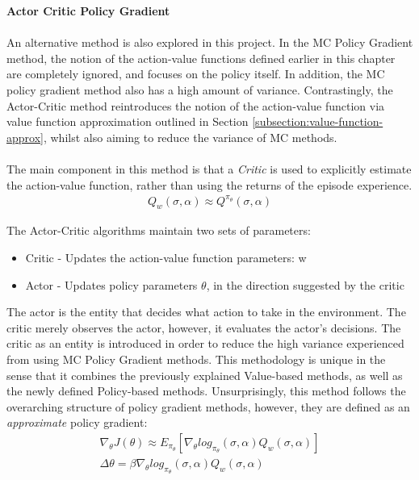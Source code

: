 \documentclass[ %
                    author={Ashwinder Khurana},
                supervisor={Prof Dave Cliff},
                    degree={MEng},
                     title={The Deeply Reinforced Trader},
                  subtitle={},
                      type={enterprise},
                      year={2020} ]{dissertation}
\begin{document}
{\noindent
\textbf{Actor Critic Policy Gradient}
\\
\\
\noindent 
An alternative method is also explored in this project. In the MC Policy Gradient method, the notion of the action-value functions defined earlier in this chapter are completely ignored, and focuses on the policy itself. In addition, the MC policy gradient method also has a high amount of variance.  Contrastingly, the Actor-Critic method reintroduces the notion of the action-value function via value function approximation outlined in Section \ref{subsection:value-function-approx}, whilst also aiming to reduce the variance of MC methods.
\\
\\
\noindent
The main component in this method is that a \textit{Critic} is used to explicitly estimate the action-value function, rather than using the returns of the episode experience.
\begin{equation}
\begin{split}
Q_w(\sigma,\alpha) \approx Q^{\pi_{\theta}} (\sigma, \alpha)
\end{split}
\end{equation}

\noindent
The Actor-Critic algorithms maintain two sets of parameters:
\begin{itemize}
\item Critic - Updates the action-value function parameters: w
\item Actor - Updates policy parameters $\theta$, in the direction suggested by the critic
\end{itemize}

\noindent
The actor is the entity that decides what action to take in the environment. The critic merely observes the actor, however, it evaluates the actor's decisions. 
The critic as an entity is introduced in order to reduce the high variance experienced from using MC Policy Gradient methods. This methodology is unique in the sense that it combines the previously explained Value-based methods, as well as the newly defined Policy-based methods.  Unsurprisingly, this method follows the overarching structure of policy gradient methods, however, they are defined as an \textit{approximate} policy gradient:
\begin{equation}
\begin{split}
\nabla_\theta J(\theta) \approx E_{\pi_{\theta}} [\nabla_\theta log_{\pi_{\theta}}(\sigma,\alpha) Q_w(\sigma, \alpha)]\\
\Delta \theta = \beta \nabla_\theta log_{\pi_{\theta}}(\sigma,\alpha) Q_w(\sigma, \alpha)
\end{split}
\end{equation}

}
\end{document}
